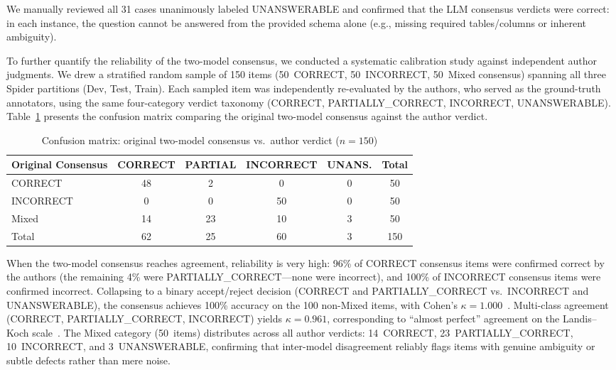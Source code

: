 \documentclass[print]{einformatica}
\begin{document}
We manually reviewed all 31 cases unanimously labeled UNANSWERABLE and confirmed that the LLM consensus verdicts were correct: in each instance, the question cannot be answered from the provided schema alone (e.g., missing required tables/columns or inherent ambiguity).

\label{sec:calibration}To further quantify the reliability of the two-model consensus, we conducted a systematic calibration study against independent author judgments. We drew a stratified random sample of 150 items (50~CORRECT, 50~INCORRECT, 50~Mixed consensus) spanning all three Spider partitions (Dev, Test, Train). Each sampled item was independently re-evaluated by the authors, who served as the ground-truth annotators, using the same four-category verdict taxonomy (CORRECT, PARTIALLY\_CORRECT, INCORRECT, UNANSWERABLE). Table~\ref{tab:calibration} presents the confusion matrix comparing the original two-model consensus against the author verdict.

\begin{table}[ht]
    \caption{Confusion matrix: original two-model consensus vs.\ author verdict ($n=150$)}
    \label{tab:calibration}
    \centering
    \footnotesize
    \begin{tabular}{lccccc}
        \toprule
        \textbf{Original Consensus} & \textbf{CORRECT} & \textbf{PARTIAL} & \textbf{INCORRECT} & \textbf{UNANS.} & \textbf{Total} \\
        \midrule
        CORRECT          & 48 & 2  & 0  & 0 & 50 \\
        INCORRECT        & 0  & 0  & 50 & 0 & 50 \\
        Mixed            & 14 & 23 & 10 & 3 & 50 \\
        \midrule
        Total            & 62 & 25 & 60 & 3 & 150 \\
        \bottomrule
    \end{tabular}
\end{table}

When the two-model consensus reaches agreement, reliability is very high: 96\% of CORRECT consensus items were confirmed correct by the authors (the remaining 4\% were PARTIALLY\_CORRECT---none were incorrect), and 100\% of INCORRECT consensus items were confirmed incorrect. Collapsing to a binary accept/reject decision (CORRECT and PARTIALLY\_CORRECT vs.\ INCORRECT and UNANSWERABLE), the consensus achieves 100\% accuracy on the 100 non-Mixed items, with Cohen's $\kappa = 1.000$~\cite{cohen1960coefficient}. Multi-class agreement (CORRECT, PARTIALLY\_CORRECT, INCORRECT) yields $\kappa = 0.961$, corresponding to ``almost perfect'' agreement on the Landis--Koch scale~\cite{landis1977measurement}. The Mixed category (50~items) distributes across all author verdicts: 14~CORRECT, 23~PARTIALLY\_CORRECT, 10~INCORRECT, and 3~UNANSWERABLE, confirming that inter-model disagreement reliably flags items with genuine ambiguity or subtle defects rather than mere noise.
\end{document}
